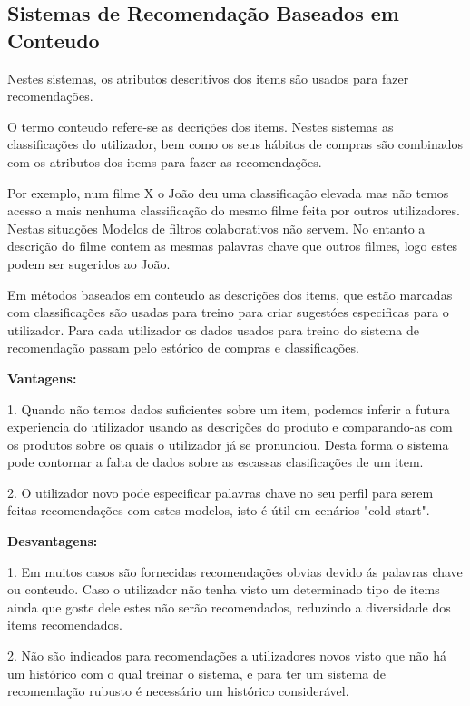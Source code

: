 \hfill
\subsection{Sistemas de Recomendação Baseados em Conteudo}
\hfill
\par Nestes sistemas, os atributos descritivos dos items são usados para fazer recomendações.
\par O termo conteudo refere-se as decrições dos items. Nestes sistemas as classificações do utilizador, bem como os seus hábitos de compras são combinados com os atributos dos items para fazer as recomendações. 
\par Por exemplo, num filme X o João deu uma classificação elevada mas não temos acesso a mais nenhuma classificação do mesmo filme feita por outros utilizadores. Nestas situações Modelos de filtros colaborativos não servem. No entanto a descrição do filme contem as mesmas palavras chave que outros filmes, logo estes podem ser sugeridos ao João.
\par Em métodos baseados em conteudo as descrições dos items, que estão marcadas com classificações são usadas para treino para criar sugestóes especificas para o utilizador. Para cada utilizador os dados usados para treino do sistema de recomendação passam pelo estórico de compras e classificações.\newline


\textbf{Vantagens:}\hfill
\hfill
\par 1. Quando não temos dados suficientes sobre um item, podemos inferir a futura experiencia do utilizador usando as descrições do produto e comparando-as com os produtos sobre os quais o utilizador já se pronunciou. Desta forma o sistema pode contornar a falta de dados sobre as escassas clasificações de um item.\newline
\hfill
\par 2. O utilizador novo pode especificar palavras chave no seu perfil para serem feitas recomendações com estes modelos, isto é útil em cenários "cold-start".\newline

\textbf{Desvantagens:}\hfill
\hfill
\par 1. Em muitos casos são fornecidas recomendações obvias devido ás palavras chave ou conteudo. Caso o utilizador não tenha visto um determinado tipo de items ainda que goste dele estes não serão recomendados, reduzindo a diversidade dos items recomendados.\newline
\hfill
\par 2. Não são indicados para recomendações a utilizadores novos visto que não há um histórico com o qual treinar o sistema, e para ter um sistema de recomendação rubusto é necessário um histórico considerável.\newline


